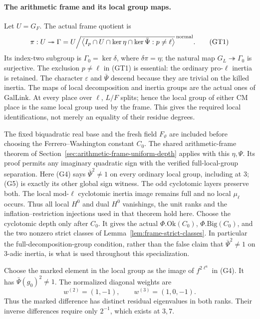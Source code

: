 \paragraph{The arithmetic frame and its local group maps.}
Let \(U=G_F\).
The actual frame quotient is
\[
 \pi:U\twoheadrightarrow\Gamma
   =U\Big/
    \overline{\left\langle
       I_p\cap U\cap\ker\eta\cap\ker\bar\Psi:
                                      p\ne\ell
                         \right\rangle}^{\,\rm normal}.
 \tag{GT1}
\]
Its index-two subgroup is \(\Gamma_0=\ker\delta\),
where \(\delta\pi=\eta\); the natural map
\(G_L\twoheadrightarrow\Gamma_0\) is surjective.
The exclusion \(p\ne\ell\) in (GT1) is essential:
the ordinary pro-\(\ell\) inertia is retained.
The character \(\varepsilon\) and \(\bar\Psi\)
descend because they are trivial on the killed
inertia.
The maps of local decomposition and inertia groups
are the actual ones of \(\mathrm{GalLink}\).
At every place over \(\ell\), \(L/F\) splits;
hence the local group of either CM place is
the same local group used by the frame.
This gives the required local identifications, not
merely an equality of their residue degrees.

The fixed biquadratic real base and the fresh field
\(F_\vartheta\) are included before choosing the
Ferrero--Washington constant \(C_0\).
The shared arithmetic-frame theorem of
Section~\ref{sec:arithmetic-frame-uniform-depth}
applies with this \(\eta,\Psi\).
Its proof permits any imaginary quadratic sign
with the verified full-local-group separation.
Here (G4) says \(\bar\Psi^2\ne1\) on every
ordinary local group, including at \(3\);
(G5) is exactly its other global sign witness.
The odd cyclotomic layers preserve both.
The local mod-\(\ell\) cyclotomic inertia image
remains full and no local \(\mu_\ell\) occurs.
Thus all local \(H^0\) and dual \(H^0\) vanishings,
the unit ranks and the inflation--restriction
injections used in that theorem hold here.
Choose the cyclotomic depth only after \(C_0\).
It gives the actual \(\Phi.\mathrm{Ok}(C_0)\),
\(\Phi.\mathrm{Big}(C_0)\), and the two nonzero
strict classes of
Lemma~\ref{lem:frame-strict-classes}.
In particular the full-decomposition-group condition,
rather than the false claim that
\(\bar\Psi^2\ne1\) on \(3\)-adic inertia, is what
is used throughout this specialization.

Choose the marked element in the local group as
the image of \(f^{2\ell^u}\) in (G4).
It has \(\bar\Psi(g_0)^2\ne1\).
The normalized diagonal weights are
\[
                  w^{(2)}=(1,-1),\qquad
                  w^{(3)}=(1,0,-1).
 \tag{GT2}
\]
Thus the marked difference has distinct residual
eigenvalues in both ranks. Their inverse differences
require only \(2^{-1}\), which exists at \(3,7\).

